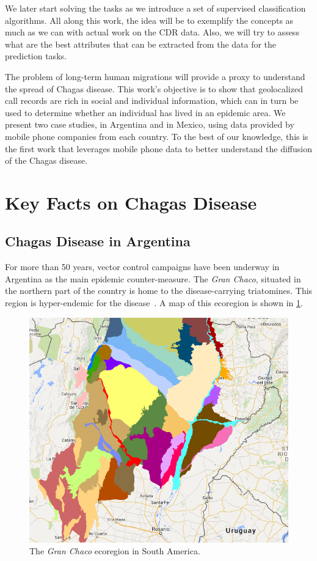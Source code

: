 We later start solving the tasks as we introduce a set of supervised classification algorithms.
All along this work, the idea will be to exemplify the concepts as much as we can with actual work on the CDR data.
Also, we will try to assess what are the best attributes that can be extracted from the data for the prediction tasks.

The problem of long-term human migrations will provide a proxy to understand the spread of Chagas disease.
This work's objective is to show that geolocalized call records are rich in social and individual information, which can in turn be used to determine whether an individual has lived in an epidemic area.
We present two case studies, in Argentina and in Mexico, using data provided by mobile phone companies from each country. %
To the best of our knowledge, this is the first work that leverages mobile phone data to better understand the diffusion of the Chagas disease.


\section{Key Facts on Chagas Disease}

\subsection{Chagas Disease in  Argentina}\label{endemic_zone_argentina}

For more than 50 years, vector control campaigns have been underway in Argentina as the main epidemic counter-measure.
The \textit{Gran Chaco}, situated in the northern part of the country is home to the disease-carrying triatomines.
This region is hyper-endemic for the disease~\citep{OPS2014mapa}.
A map of this ecoregion is shown in \cref{fig:granchaco}.

\begin{figure}[ht]
\centering
\includegraphics[width=0.75\columnwidth]{figures/Ambientes_GranChaco_TNC-Argentina/Ambientes_GranChaco_TNC-Argentina.png}
\caption{The \textit{Gran Chaco} ecoregion in South America.%
}
\label{fig:granchaco}
\end{figure}


